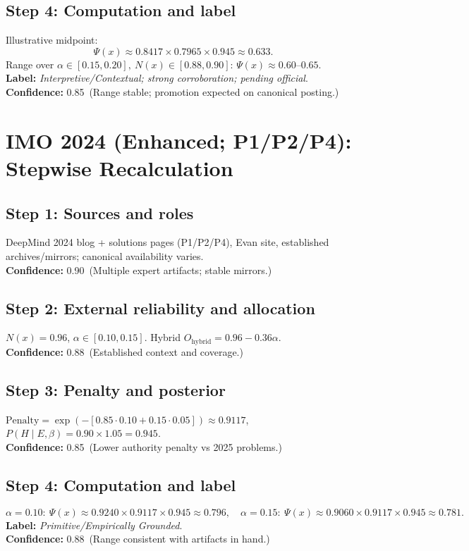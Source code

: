 \documentclass[11pt]{article}
\newcommand{\Nx}{N(x)}
\newcommand{\Px}{\Psi(x)}
\newcommand{\post}{P(H\mid E,\beta)}
\newcommand{\pen}{\mathrm{Penalty}}
\newcommand{\conf}[2]{\textbf{Confidence:} #1\ (#2)}
\begin{document}
\subsection*{Step 4: Computation and label}
Illustrative midpoint:
\[
\Px \approx 0.8417 \times 0.7965 \times 0.945 \approx 0.633.
\]
Range over $\alpha\in[0.15,0.20],\ \Nx\in[0.88,0.90]$: $\Px\approx 0.60$--$0.65$.\\
\textbf{Label:} \emph{Interpretive/Contextual; strong corroboration; pending official}.\\
\conf{0.85}{Range stable; promotion expected on canonical posting.}

\section{IMO 2024 (Enhanced; P1/P2/P4): Stepwise Recalculation}
\subsection*{Step 1: Sources and roles}
DeepMind 2024 blog + solutions pages (P1/P2/P4), Evan site, established archives/mirrors; canonical availability varies.\\
\conf{0.90}{Multiple expert artifacts; stable mirrors.}

\subsection*{Step 2: External reliability and allocation}
$\Nx=0.96$, $\alpha\in[0.10,0.15]$. Hybrid $O_{\text{hybrid}}=0.96-0.36\alpha$.\\
\conf{0.88}{Established context and coverage.}

\subsection*{Step 3: Penalty and posterior}
$\pen=\exp(-[0.85\cdot 0.10+0.15\cdot 0.05])\approx 0.9117$, $\post=0.90\times 1.05=0.945$.\\
\conf{0.85}{Lower authority penalty vs 2025 problems.}

\subsection*{Step 4: Computation and label}
\[
\alpha=0.10:\ \Px \approx 0.9240\times 0.9117\times 0.945 \approx 0.796,\quad
\alpha=0.15:\ \Px \approx 0.9060\times 0.9117\times 0.945 \approx 0.781.
\]
\textbf{Label:} \emph{Primitive/Empirically Grounded}.\\
\conf{0.88}{Range consistent with artifacts in hand.}
\end{document}
